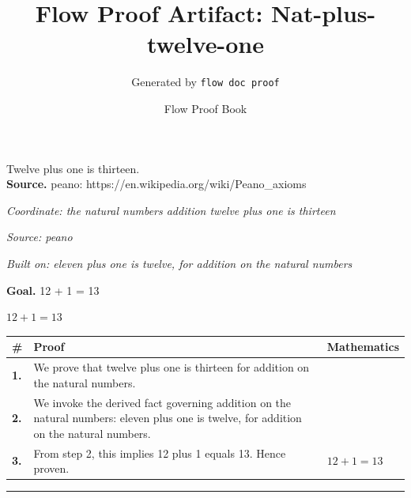 \documentclass[11pt]{article}
\title{Flow Proof Artifact: Nat-plus-twelve-one}
\author{Generated by \texttt{flow doc proof}}
\date{Flow Proof Book}
\theoremstyle{definition}
\begin{document}
\maketitle
Twelve plus one is thirteen.\\[0.5em]
\textbf{Source.} peano: https://en.wikipedia.org/wiki/Peano\_axioms\\[0.5em]
\bigskip
{}\par
\smallskip\noindent\textit{Coordinate: the natural numbers \cdot addition \cdot twelve plus one is thirteen}\par
\smallskip\noindent\textit{Source: peano}\par
\smallskip\noindent\textit{Built on: eleven plus one is twelve, for addition on the natural numbers}\par
\medskip
\noindent\textbf{Goal.} 12 + 1 = 13\par
\noindent$\displaystyle 12 + 1 = 13$\par
\medskip
\noindent
\begin{tabular}{@{} >{\raggedright\arraybackslash}p{} >{\raggedright\arraybackslash}p{} >{\raggedleft\arraybackslash}p{} @{}}
\textbf{\#} & \textbf{Proof} & \textbf{Mathematics} \\
\midrule
\textbf{1.} & We prove that twelve plus one is thirteen for addition on the natural numbers. & \\[0.45em]
\textbf{2.} & We invoke the derived fact governing addition on the natural numbers: eleven plus one is twelve, for addition on the natural numbers. & \\[0.45em]
\textbf{3.} & From step 2, this implies 12 plus 1 equals 13. Hence proven. & $\displaystyle 12 + 1 = 13$ \\[0.45em]
\bottomrule
\end{tabular}
\label{thm:Nat-addition-twelve_plus_one_is_thirteen}
\par\medskip\hrule
\end{document}
